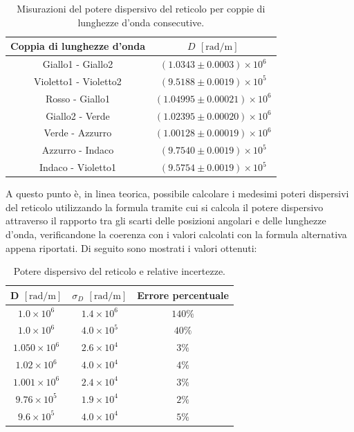 \documentclass[a4paper,12pt]{article}
\begin{document}
\begin{table}[H]
\centering
\begin{tabular}{cc}
\hline
\textbf{Coppia di lunghezze d’onda} & \textbf{\( D \)} \([\text{rad}/\text{m}] \) \\ 
\hline
Giallo1 - Giallo2 & \( (1.0343 \pm 0.0003) \times 10^6 \) \\ 
Violetto1 - Violetto2 & \( (9.5188 \pm 0.0019) \times 10^5 \) \\ 
Rosso - Giallo1 & \( (1.04995 \pm 0.00021) \times 10^6 \) \\ 
Giallo2 - Verde & \( (1.02395 \pm 0.00020) \times 10^6 \) \\ 
Verde - Azzurro & \( (1.00128 \pm 0.00019) \times 10^6 \) \\ 
Azzurro - Indaco & \( (9.7540 \pm 0.0019) \times 10^5 \) \\ 
Indaco - Violetto1 & \( (9.5754 \pm 0.0019) \times 10^5 \) \\ 
\hline
\end{tabular}
\caption{Misurazioni del potere dispersivo del reticolo per coppie di lunghezze d’onda consecutive.}
\end{table}
A questo punto è, in linea teorica, possibile calcolare i medesimi poteri dispersivi del reticolo utilizzando la formula tramite cui si calcola il potere dispersivo attraverso il rapporto tra gli scarti delle posizioni angolari e delle lunghezze d’onda, verificandone la coerenza con i valori calcolati con la formula alternativa appena riportati.
Di seguito sono mostrati i valori ottenuti:
\begin{table}[H]
    \centering
    \begin{tabular}{ccc}
    \hline
    \textbf{D} \([\text{rad}/\text{m}] \) & \textbf{\(\sigma_D\)} \([\text{rad}/\text{m}] \) & Errore percentuale\\ 
    \hline
    \( 1.0 \times 10^6 \) & \( 1.4 \times 10^6 \) & \( 140\%\) \\ 
    \( 1.0 \times 10^6 \) & \( 4.0 \times 10^5 \) & \( 40\%\) \\ 
    \( 1.050 \times 10^6 \) & \( 2.6 \times 10^4 \)& \( 3\%\) \\ 
    \( 1.02 \times 10^6 \) & \( 4.0 \times 10^4 \) & \( 4\%\) \\ 
    \( 1.001 \times 10^6 \) & \( 2.4 \times 10^4 \) & \( 3\%\) \\ 
    \( 9.76 \times 10^5 \) & \( 1.9 \times 10^4 \) & \( 2\%\) \\ 
    \( 9.6 \times 10^5 \) & \( 4.0 \times 10^4 \) & \( 5\%\) \\ 
    \hline
    \end{tabular}
    \caption{Potere dispersivo del reticolo e relative incertezze.}
    \end{table}
    
\end{document}
